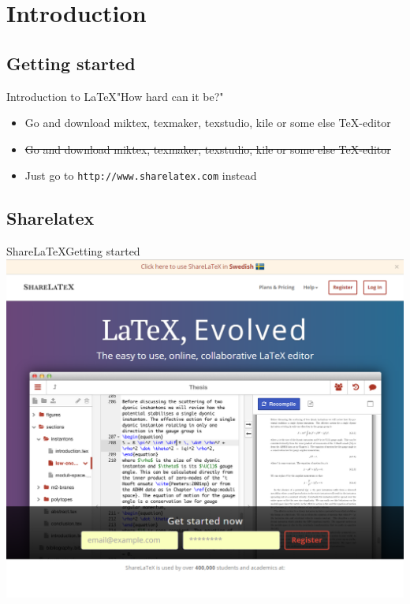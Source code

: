 \section{Introduction}
\subsection{Getting started}
\begin{frame}{Introduction to \LaTeX}{"How hard can it be?"}
    \begin{itemize}
        \item<1>{Go and download miktex, texmaker, texstudio, kile or some else TeX-editor}\pause
        \item{\sout{Go and download miktex, texmaker, texstudio, kile or some else TeX-editor}}
        \item{Just go to \texttt{http://www.sharelatex.com} instead}
    \end{itemize}
\end{frame}

\subsection{Sharelatex}
\begin{frame}{Share\LaTeX}{Getting started}
    \includegraphics[width=\textwidth]{img/1-sharelatex1.png}
\end{frame}

